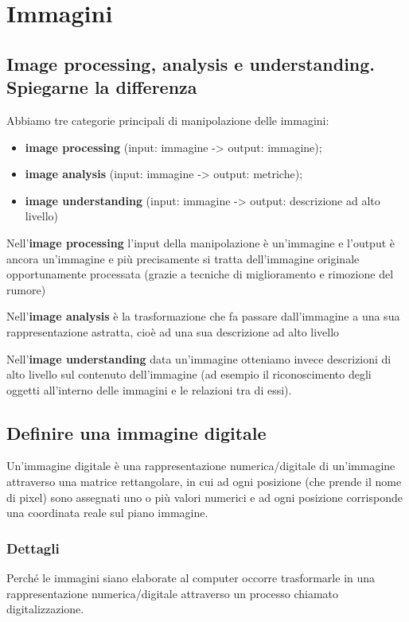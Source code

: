 \chapter{Immagini}

\section{Image processing, analysis e understanding. Spiegarne la differenza}

Abbiamo tre categorie principali di manipolazione delle immagini:
\begin{itemize}
\item \textbf{image processing} (input: immagine -> output: immagine);
\item \textbf{image analysis} (input: immagine -> output: metriche);
\item \textbf{image understanding} (input: immagine -> output: descrizione ad alto livello)
\end{itemize}

Nell'\textbf{image processing} l'input della manipolazione è un'immagine e l'output è ancora un'immagine e più precisamente si tratta dell'immagine originale opportunamente processata (grazie a tecniche di miglioramento e rimozione del rumore)

Nell'\textbf{image analysis} è la trasformazione che fa passare dall’immagine a una sua rappresentazione astratta, cioè ad una sua descrizione ad alto livello

Nell'\textbf{image understanding} data un'immagine otteniamo invece descrizioni di alto livello sul contenuto dell'immagine (ad esempio il riconoscimento degli oggetti all'interno delle immagini e le relazioni tra di essi).

\section{Definire una immagine digitale}
Un'immagine digitale è una rappresentazione numerica/digitale di un'immagine attraverso una matrice rettangolare, in cui ad ogni posizione (che prende il nome di pixel) sono assegnati uno o più valori numerici e ad ogni posizione corrisponde una coordinata reale sul piano immagine. 

\subsection{Dettagli}
Perché le immagini siano elaborate al computer occorre trasformarle in una rappresentazione numerica/digitale attraverso un processo chiamato digitalizzazione. 

